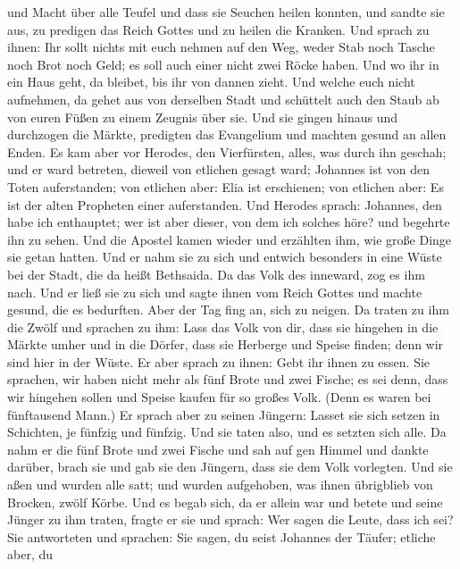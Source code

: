 und Macht über alle Teufel und dass sie Seuchen heilen konnten,
 und sandte sie aus, zu predigen das Reich Gottes und zu
heilen die Kranken.  Und sprach zu ihnen: Ihr sollt nichts
mit euch nehmen auf den Weg, weder Stab noch Tasche noch Brot noch Geld;
es soll auch einer nicht zwei Röcke haben.  Und wo ihr in
ein Haus geht, da bleibet, bis ihr von dannen zieht.  Und
welche euch nicht aufnehmen, da gehet aus von derselben Stadt und
schüttelt auch den Staub ab von euren Füßen zu einem Zeugnis über sie.
 Und sie gingen hinaus und durchzogen die Märkte, predigten
das Evangelium und machten gesund an allen Enden.  Es kam
aber vor Herodes, den Vierfürsten, alles, was durch ihn geschah; und er
ward betreten, dieweil von etlichen gesagt ward; Johannes ist von den
Toten auferstanden;  von etlichen aber: Elia ist erschienen;
von etlichen aber: Es ist der alten Propheten einer auferstanden.
 Und Herodes sprach: Johannes, den habe ich enthauptet; wer
ist aber dieser, von dem ich solches höre? und begehrte ihn zu sehen.
 Und die Apostel kamen wieder und erzählten ihm, wie große
Dinge sie getan hatten. Und er nahm sie zu sich und entwich besonders in
eine Wüste bei der Stadt, die da heißt Bethsaida.  Da das
Volk des inneward, zog es ihm nach. Und er ließ sie zu sich und sagte
ihnen vom Reich Gottes und machte gesund, die es bedurften. Aber der Tag
fing an, sich zu neigen.  Da traten zu ihm die Zwölf und
sprachen zu ihm: Lass das Volk von dir, dass sie hingehen in die Märkte
umher und in die Dörfer, dass sie Herberge und Speise finden; denn wir
sind hier in der Wüste.  Er aber sprach zu ihnen: Gebt ihr
ihnen zu essen. Sie sprachen, wir haben nicht mehr als fünf Brote und
zwei Fische; es sei denn, dass wir hingehen sollen und Speise kaufen für
so großes Volk.  (Denn es waren bei fünftausend Mann.) Er
sprach aber zu seinen Jüngern: Lasset sie sich setzen in Schichten, je
fünfzig und fünfzig.  Und sie taten also, und es setzten
sich alle.  Da nahm er die fünf Brote und zwei Fische und
sah auf gen Himmel und dankte darüber, brach sie und gab sie den
Jüngern, dass sie dem Volk vorlegten.  Und sie aßen und
wurden alle satt; und wurden aufgehoben, was ihnen übrigblieb von
Brocken, zwölf Körbe.  Und es begab sich, da er allein war
und betete und seine Jünger zu ihm traten, fragte er sie und sprach: Wer
sagen die Leute, dass ich sei?  Sie antworteten und
sprachen: Sie sagen, du seist Johannes der Täufer; etliche aber, du
